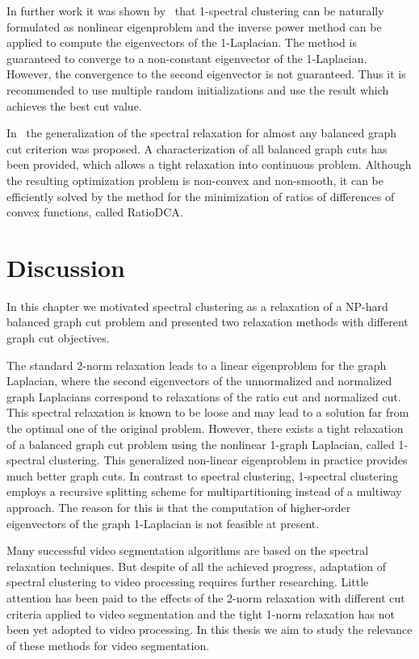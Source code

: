 In further work it was shown by~\cite{Hein10} that 1-spectral clustering can be naturally formulated as nonlinear eigenproblem and the inverse power method can be applied to compute the eigenvectors of the 1-Laplacian. 
The method is guaranteed to converge to a non-constant eigenvector of the 1-Laplacian. However, the convergence to the second eigenvector is not guaranteed. Thus it is recommended to use multiple random initializations and 
use the result which achieves the best cut value.

In~\cite{HeinS11} the generalization of the spectral relaxation for almost any balanced graph cut criterion was proposed. A characterization of all balanced graph cuts has been provided, which allows a tight relaxation into 
continuous problem. Although the resulting optimization problem is non-convex and non-smooth, it can be efficiently solved by the method for the minimization of ratios of differences of convex functions, called RatioDCA. 
\section{Discussion}
\label{ch2:disc}
In this chapter we motivated spectral clustering as a relaxation of a NP-hard balanced graph cut problem and presented two relaxation methods with different graph cut objectives.

The standard 2-norm relaxation leads to a linear eigenproblem for the graph Laplacian, where the second eigenvectors
of the unnormalized and normalized graph Laplacians correspond to relaxations of the ratio cut and normalized cut. 
This spectral relaxation is known to be loose and may lead to a solution far from the optimal one of the original problem.
However, there exists a tight relaxation of a balanced graph cut problem using the nonlinear 1-graph Laplacian, called 1-spectral clustering.
This generalized non-linear eigenproblem in practice provides much better graph cuts. 
In contrast to spectral clustering, 1-spectral clustering employs a recursive splitting scheme for multipartitioning instead of a multiway approach. The reason for this is
that the computation of higher-order eigenvectors of the graph 1-Laplacian is not feasible at present.

Many successful video segmentation algorithms are based on the spectral relaxation techniques. 
But despite of all the achieved progress, adaptation of spectral clustering to video processing requires further researching.
Little attention has been paid to the effects of the 2-norm relaxation 
with different cut criteria applied to video segmentation and the tight 1-norm relaxation has not been yet adopted to video processing. 
In this thesis we aim to study the relevance of these methods for video segmentation.